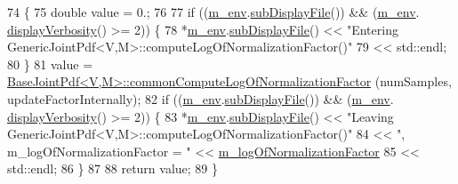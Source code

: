 \begin{DoxyCode}
74 \{
75   \textcolor{keywordtype}{double} value = 0.;
76 
77   \textcolor{keywordflow}{if} ((\hyperlink{class_q_u_e_s_o_1_1_base_scalar_function_adf44141aeb765d97613286f88f235f04}{m\_env}.\hyperlink{class_q_u_e_s_o_1_1_base_environment_a8a0064746ae8dddfece4229b9ad374d6}{subDisplayFile}()) && (\hyperlink{class_q_u_e_s_o_1_1_base_scalar_function_adf44141aeb765d97613286f88f235f04}{m\_env}.
      \hyperlink{class_q_u_e_s_o_1_1_base_environment_a1fe5f244fc0316a0ab3e37463f108b96}{displayVerbosity}() >= 2)) \{
78     *\hyperlink{class_q_u_e_s_o_1_1_base_scalar_function_adf44141aeb765d97613286f88f235f04}{m\_env}.\hyperlink{class_q_u_e_s_o_1_1_base_environment_a8a0064746ae8dddfece4229b9ad374d6}{subDisplayFile}() << \textcolor{stringliteral}{"Entering
       GenericJointPdf<V,M>::computeLogOfNormalizationFactor()"}
79                             << std::endl;
80   \}
81   value = \hyperlink{class_q_u_e_s_o_1_1_base_joint_pdf_a7b7bdd13d2de51198bf75d522e02545b}{BaseJointPdf<V,M>::commonComputeLogOfNormalizationFactor}
      (numSamples, updateFactorInternally);
82   \textcolor{keywordflow}{if} ((\hyperlink{class_q_u_e_s_o_1_1_base_scalar_function_adf44141aeb765d97613286f88f235f04}{m\_env}.\hyperlink{class_q_u_e_s_o_1_1_base_environment_a8a0064746ae8dddfece4229b9ad374d6}{subDisplayFile}()) && (\hyperlink{class_q_u_e_s_o_1_1_base_scalar_function_adf44141aeb765d97613286f88f235f04}{m\_env}.
      \hyperlink{class_q_u_e_s_o_1_1_base_environment_a1fe5f244fc0316a0ab3e37463f108b96}{displayVerbosity}() >= 2)) \{
83     *\hyperlink{class_q_u_e_s_o_1_1_base_scalar_function_adf44141aeb765d97613286f88f235f04}{m\_env}.\hyperlink{class_q_u_e_s_o_1_1_base_environment_a8a0064746ae8dddfece4229b9ad374d6}{subDisplayFile}() << \textcolor{stringliteral}{"Leaving
       GenericJointPdf<V,M>::computeLogOfNormalizationFactor()"}
84                             << \textcolor{stringliteral}{", m\_logOfNormalizationFactor = "} << 
      \hyperlink{class_q_u_e_s_o_1_1_base_joint_pdf_ae82d4191f17af8c7a26226d127bc7850}{m\_logOfNormalizationFactor}
85                             << std::endl;
86   \}
87 
88   \textcolor{keywordflow}{return} value;
89 \}
\end{DoxyCode}
